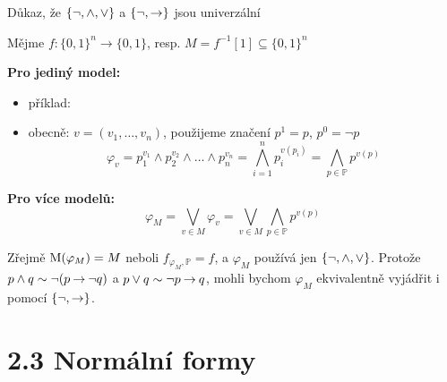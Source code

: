 \documentclass{beamer}
\begin{document}
\begin{frame}{Důkaz, že $\{\neg, {\land},{\lor}\}$ a $\{\neg, {\mathbin{\rightarrow}}\}$ jsou univerzální}  

    Mějme $f\colon \{0,1\}^n\to \{0,1\}$, resp. $M=f^{-1}[1]\subseteq \{0,1\}^n$
 
    \textbf{Pro jediný model:} 

    \begin{itemize}
        \item příklad: 
        \item obecně: $v=(v_1,\dots,v_n)$, použijeme značení $p^1=p$, $p^0=\neg p$
        $$
        \varphi_v = p_1^{v_1}\land p_2^{v_2}\land \dots\land p_n^{v_n}=\bigwedge_{i=1}^n p_i^{v(p_i)}=\bigwedge_{p\in\mathbb P}p^{v(p)}
        $$    
    \end{itemize}
    
    \textbf{Pro více modelů:} 
    $$
    \varphi_M = \bigvee_{v\in M}\varphi_v=\bigvee_{v\in M}\bigwedge_{p\in\mathbb P}p^{v(p)}
    $$

    Zřejmě $\operatorname{M}(\varphi_M)=M$ neboli $f_{\varphi_M,\mathbb P}=f$, a $\varphi_M$ používá jen $\{\neg, {\land},{\lor}\}$. Protože $p\land q\sim \neg (p\mathbin{\rightarrow} \neg q)$ a $p\lor q\sim \neg p\mathbin{\rightarrow} q$, mohli bychom $\varphi_M$ ekvivalentně vyjádřit i pomocí  $\{\neg, {\mathbin{\rightarrow}}\}$. \hfill\qedsymbol   

\end{frame}


\section{2.3 Normální formy}
\end{document}
